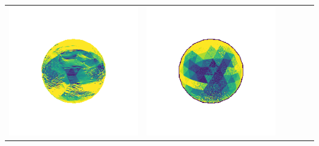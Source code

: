 \begin{tabularx}{\linewidth}{@{}Y@{}Y@{}Y@{}Y@{}Y@{}Y@{}}
\includegraphics[width=\linewidth]{semisynthetic/20150514_1_yu_err.png} &
\includegraphics[width=\linewidth]{semisynthetic/20150514_1_dpsn_err.png} &

\end{tabularx}

